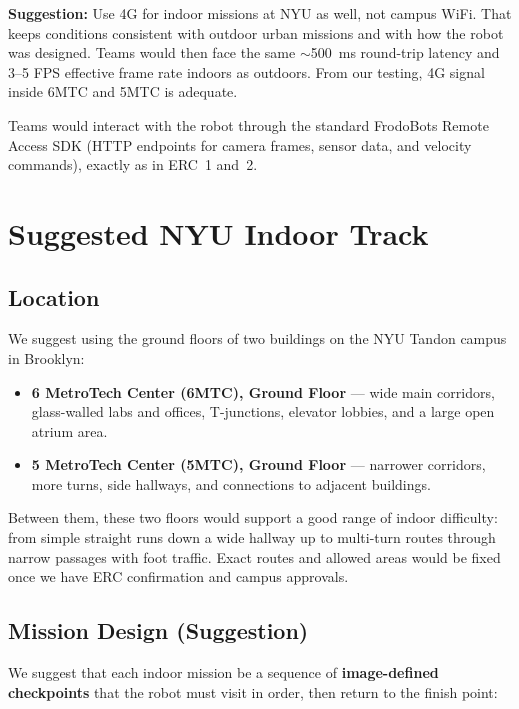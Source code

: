 \documentclass[11pt,a4paper]{article}
\begin{document}
\textbf{Suggestion:} Use 4G for indoor missions at NYU as well, not campus WiFi. That keeps conditions consistent with outdoor urban missions and with how the robot was designed. Teams would then face the same $\sim$500~ms round-trip latency and 3--5 FPS effective frame rate indoors as outdoors. From our testing, 4G signal inside 6MTC and 5MTC is adequate.

Teams would interact with the robot through the standard FrodoBots Remote Access SDK (HTTP endpoints for camera frames, sensor data, and velocity commands), exactly as in ERC~1 and~2.


\section{Suggested NYU Indoor Track}

\subsection{Location}

We suggest using the ground floors of two buildings on the NYU Tandon campus in Brooklyn:

\begin{itemize}
    \item \textbf{6 MetroTech Center (6MTC), Ground Floor} --- wide main corridors, glass-walled labs and offices, T-junctions, elevator lobbies, and a large open atrium area.
    \item \textbf{5 MetroTech Center (5MTC), Ground Floor} --- narrower corridors, more turns, side hallways, and connections to adjacent buildings.
\end{itemize}

Between them, these two floors would support a good range of indoor difficulty: from simple straight runs down a wide hallway up to multi-turn routes through narrow passages with foot traffic. Exact routes and allowed areas would be fixed once we have ERC confirmation and campus approvals.


\subsection{Mission Design (Suggestion)}

We suggest that each indoor mission be a sequence of \textbf{image-defined checkpoints} that the robot must visit in order, then return to the finish point:
\end{document}
